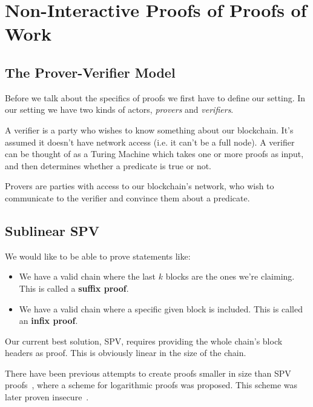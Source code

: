 \section{Non-Interactive Proofs of Proofs of Work}


\subsection{The Prover-Verifier Model}
Before we talk about the specifics of proofs  we first have to define our setting. In our setting we have two kinds of actors, \emph{provers} and \emph{verifiers}.

A verifier is a party who wishes to know something about our blockchain. It's  assumed it doesn't have network access (i.e. it can't be a full node). A verifier can be thought of as a Turing Machine which takes one or more proofs as input, and then determines whether a predicate  is true or not.

Provers are parties with access to our blockchain's network, who wish to communicate to the verifier and convince them about a predicate.

\subsection{Sublinear SPV}
We would like to be able to prove statements like:

\begin{itemize}
  \item We have a valid chain where the last $k$ blocks are the ones we're claiming. This is called a \textbf{suffix proof}.
  \item We have a valid chain where a specific given block is included. This is called an \textbf{infix proof}.
\end{itemize}

Our current best solution, SPV, requires providing the whole chain's block headers as proof. This is obviously linear in the size of the chain.

There have been previous attempts to create proofs smaller in size than SPV proofs~\cite{KLS}, where a scheme for logarithmic proofs was proposed.  This scheme was later proven insecure~\cite{nipopows}.

